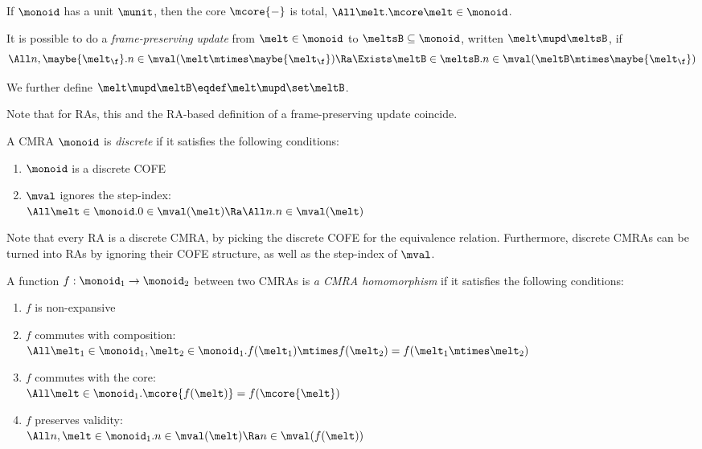\begin{lem}\label{lem:cmra-unit-total-core}
  If $\monoid$ has a unit $\munit$, then the core $\mcore{{-}}$ is total, \ie $\All\melt. \mcore\melt \in \monoid$.
\end{lem}

\begin{defn}
  It is possible to do a \emph{frame-preserving update} from $\melt \in \monoid$ to $\meltsB \subseteq \monoid$, written $\melt \mupd \meltsB$, if
  \[ \All n, \maybe{\melt_\f}. n \in \mval(\melt \mtimes \maybe{\melt_\f}) \Ra \Exists \meltB \in \meltsB. n \in\mval(\meltB \mtimes \maybe{\melt_\f}) \]

  We further define $\melt \mupd \meltB \eqdef \melt \mupd \set\meltB$.
\end{defn}
Note that for RAs, this and the RA-based definition of a frame-preserving update coincide.

\begin{defn}
  A CMRA $\monoid$ is \emph{discrete} if it satisfies the following conditions:
  \begin{enumerate}[itemsep=0pt]
  \item $\monoid$ is a discrete COFE
  \item $\mval$ ignores the step-index: \\
    $\All \melt \in \monoid. 0 \in \mval(\melt) \Ra \All n. n \in \mval(\melt)$
  \end{enumerate}
\end{defn}
Note that every RA is a discrete CMRA, by picking the discrete COFE for the equivalence relation.
Furthermore, discrete CMRAs can be turned into RAs by ignoring their COFE structure, as well as the step-index of $\mval$.

\begin{defn}
  A function $f : \monoid_1 \to \monoid_2$ between two CMRAs is \emph{a CMRA homomorphism} if it satisfies the following conditions:
  \begin{enumerate}[itemsep=0pt]
  \item $f$ is non-expansive
  \item $f$ commutes with composition:\\
    $\All \melt_1 \in \monoid_1, \melt_2 \in \monoid_1. f(\melt_1) \mtimes f(\melt_2) = f(\melt_1 \mtimes \melt_2)$
  \item $f$ commutes with the core:\\
    $\All \melt \in \monoid_1. \mcore{f(\melt)} = f(\mcore{\melt})$
  \item $f$ preserves validity: \\
    $\All n, \melt \in \monoid_1. n \in \mval(\melt) \Ra n \in \mval(f(\melt))$
  \end{enumerate}
\end{defn}

